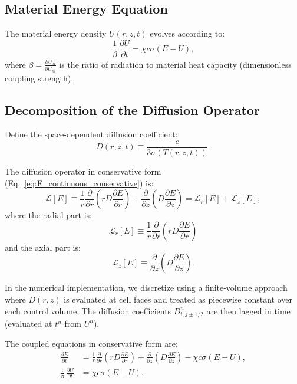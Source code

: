 \documentclass[12pt,oneside]{article}
\begin{document}
\subsection{Material Energy Equation}

The material energy density $U(r,z,t)$ evolves according to:
\begin{equation}
\frac{1}{\beta}\,\frac{\partial U}{\partial t}
=
\chi c\sigma(E - U),
\label{eq:U_continuous}
\end{equation}
where $\beta = \frac{\partial U_R}{\partial U_m}$ is the ratio of radiation to material heat capacity (dimensionless coupling strength).

\subsection{Decomposition of the Diffusion Operator}

Define the space-dependent diffusion coefficient:
\begin{equation}
D(r,z,t)
\equiv
\frac{c}{3\sigma(T(r,z,t))}.
\end{equation}

The diffusion operator in conservative form (Eq.~\eqref{eq:E_continuous_conservative}) is:
\begin{equation}
\mathcal{L}[E]
\equiv
\frac{1}{r}\frac{\partial}{\partial r}\left(rD\frac{\partial E}{\partial r}\right) + \frac{\partial}{\partial z}\left(D\frac{\partial E}{\partial z}\right)
=
\mathcal{L}_r[E] + \mathcal{L}_z[E],
\end{equation}
where the radial part is:
\begin{equation}
\mathcal{L}_r[E]
\equiv
\frac{1}{r}\frac{\partial}{\partial r}\left(rD\frac{\partial E}{\partial r}\right)
\end{equation}
and the axial part is:
\begin{equation}
\mathcal{L}_z[E]
\equiv
\frac{\partial}{\partial z}\left(D\frac{\partial E}{\partial z}\right).
\end{equation}

In the numerical implementation, we discretize using a finite-volume approach where $D(r,z)$ is evaluated at cell faces and treated as piecewise constant over each control volume. The diffusion coefficients $D^n_{i,j\pm1/2}$ are then lagged in time (evaluated at $t^n$ from $U^n$).

The coupled equations in conservative form are:
\begin{align}
\frac{\partial E}{\partial t}
&=
\frac{1}{r}\frac{\partial}{\partial r}\left(rD\frac{\partial E}{\partial r}\right) + \frac{\partial}{\partial z}\left(D\frac{\partial E}{\partial z}\right)
-
\chi c\sigma(E - U),
\label{eq:E_decomposed}\\
\frac{1}{\beta}\,\frac{\partial U}{\partial t}
&=
\chi c\sigma(E - U).
\label{eq:U_decomposed}
\end{align}
\end{document}
